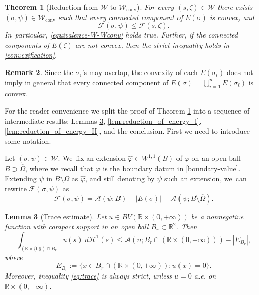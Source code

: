 \documentclass[11pt]{article}
\numberwithin{equation}{section}
\newcommand{\R}{\mathbb{R}}
\newcommand{\largercomp}{\mathcal W}
\let\sigmamin\sigma
\let\psimin\psi
\newcommand\admclassconv{{\mathcal W_\mathrm{conv}}}
\newtheorem{theorem}{Theorem}[section]
\newtheorem{lemma}[theorem]{Lemma}
\theoremstyle{definition}
\newtheorem{remark}[theorem]{Remark}
\begin{document}
\begin{theorem}[Reduction from $\largercomp$ to $\admclassconv$]
\label{teo:reduction_from_W_to_Wconv}
For every $(s,\zeta)\in\largercomp$ there exists $(\sigmamin,\psimin)\in\admclassconv$ such that every connected component of $E(\sigmamin)$ is convex, and
\begin{equation}\label{convexification}
{\mathcal{F}}(\sigmamin,\psimin)\le{\mathcal{F}}(s,\zeta).
\end{equation}
In~particular, \eqref{equivalence-W-Wconv} holds true.
Further, if the connected components of $E(\zeta)$ are not convex, then the
strict inequality holds in \eqref{convexification}.
\end{theorem}

\begin{remark}
Since the $\sigma_i$'s may overlap, the convexity of each
$E(\sigma_i)$ does not imply in general that every connected component of $E(\sigma)=\bigcup_{i=1}^nE(\sigma_i)$ is convex.
\end{remark}
For the reader convenience
we split the proof of Theorem \ref{teo:reduction_from_W_to_Wconv}
into a sequence of intermediate results: Lemmas \ref{lem:trace_estimate}, \ref{lem:reduction_of_energy_I}, \ref{lem:reduction_of_energy_II},
and the conclusion.
First we need to introduce some notation.

Let $(\sigma,\psi)\in \largercomp$. We~fix an extension $\widehat \varphi\in W^{1,1}(B)$
of $\varphi$ on an open ball $B\supset\overline\Omega$, where we recall that $\varphi$ is the boundary datum in \eqref{boundary-value}.
Extending $\psi$ in $B \setminus \overline\Omega$ as $\widehat \varphi$,
and still denoting by $\psi$ such an extension, we~can
rewrite $\mathcal F(\sigma,\psi)$ as
\begin{equation}\label{eq:equivalent_forumulation_of_F}
{\mathcal F}(\sigma,\psi)=\mathcal A(\psi;B)-|E(\sigma)|-\mathcal A(\psi;B\setminus \overline\Omega).
\end{equation}

\begin{lemma}[Trace estimate]\label{lem:trace_estimate}
Let $u\in BV(\R\times (0,+\infty))$ be a nonnegative function with compact support in an open ball $B_r\subset\R^2$. Then
\begin{equation}\label{eq:trace}
\int_{(\R\times\{0\})\cap B_r}u(s)\;d\mathcal H^1(s)\leq \mathcal A(u;B_r\cap (\R\times(0,+\infty)))-|E_{B_r}|,
\end{equation}
where
\[
E_{B_r}:=\{x\in B_{r}\cap (\R\times (0,+\infty)):u(x)=0\}.
\]
Moreover, inequality \eqref{eq:trace} is always strict, unless $u=0$ a.e. on $ \R \times (0,+\infty)$.
\end{lemma}
\end{document}
